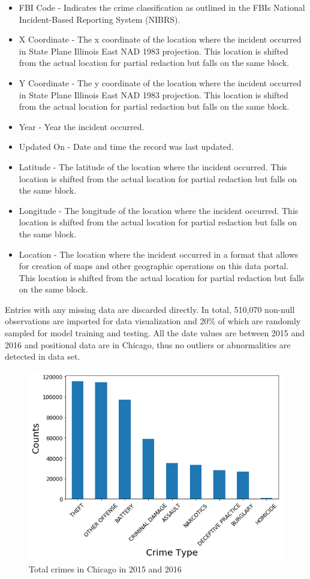 \documentclass[12pt]{article}
\begin{document}
\begin{itemize}
\item FBI Code - Indicates the crime classification as outlined in the FBIs National Incident-Based Reporting System (NIBRS).
\item X Coordinate - The x coordinate of the location where the incident occurred in State Plane Illinois East NAD 1983 projection. This location is shifted from the actual location for partial redaction but falls on the same block.
\item Y Coordinate - The y coordinate of the location where the incident occurred in State Plane Illinois East NAD 1983 projection. This location is shifted from the actual location for partial redaction but falls on the same block.
\item Year - Year the incident occurred.
\item Updated On - Date and time the record was last updated.
\item Latitude - The latitude of the location where the incident occurred. This location is shifted from the actual location for partial redaction but falls on the same block.
\item Longitude - The longitude of the location where the incident occurred. This location is shifted from the actual location for partial redaction but falls on the same block.
\item Location - The location where the incident occurred in a format that allows for creation of maps and other geographic operations on this data portal. This location is shifted from the actual location for partial redaction but falls on the same block.
\end{itemize}

Entries with any missing data are discarded directly. In total, 510,070 non-null observations are imported for data visualization and 20\% of which are randomly sampled for model training and testing. All the date values are between 2015 and 2016 and positional data are in Chicago, thus no outliers or abnormalities are detected in data set.

\begin{figure}[ht]
\includegraphics[scale=0.5]{figure/total_crime.png}
\centering
\caption{Total crimes in Chicago in 2015 and 2016}
\label{fig:count}
\end{figure}
  
\end{document}
